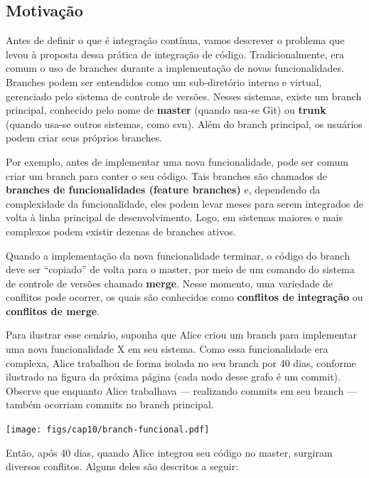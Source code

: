 \documentclass[
  11pt,
  twoside]{book}
\let\origfigure\figure
\let\endorigfigure\endfigure
\renewenvironment{figure}[1][2] {
    \expandafter\origfigure\expandafter[!h]
} {
    \endorigfigure
}
\begin{document}
\hypertarget{motivauxe7uxe3o}{%
\subsection{Motivação}\label{motivauxe7uxe3o}}

Antes de definir o que é integração contínua, vamos descrever o problema
que levou à proposta dessa prática de integração de código.
Tradicionalmente, era comum o uso de branches durante a implementação de
novas funcionalidades. Branches podem ser entendidos como um
sub-diretório interno e virtual, gerenciado pelo sistema de controle de
versões. Nesses sistemas, existe um branch principal, conhecido pelo
nome de \textbf{master} (quando usa-se Git) ou \textbf{trunk} (quando
usa-se outros sistemas, como svn). Além do branch principal, os usuários
podem criar seus próprios branches.

Por exemplo, antes de implementar uma nova funcionalidade, pode ser
comum criar um branch para conter o seu código. Tais branches são
chamados de \textbf{branches de funcionalidades (feature branches)} e,
dependendo da complexidade da funcionalidade, eles podem levar meses
para serem integrados de volta à linha principal de desenvolvimento.
Logo, em sistemas maiores e mais complexos podem existir dezenas de
branches ativos.

  Quando a
implementação da nova funcionalidade terminar, o código do branch deve
ser ``copiado'' de volta para o master, por meio de um comando do
sistema de controle de versões chamado \textbf{merge}. Nesse momento,
uma variedade de conflitos pode ocorrer, os quais são conhecidos como
\textbf{conflitos de integração} ou \textbf{conflitos de merge}.

Para ilustrar esse cenário, suponha que Alice criou um branch para
implementar uma nova funcionalidade X em seu sistema. Como essa
funcionalidade era complexa, Alice trabalhou de forma isolada no seu
branch por 40 dias, conforme ilustrado na figura da próxima página (cada
nodo desse grafo é um commit). Observe que enquanto Alice trabalhava ---
realizando commits em seu branch --- também ocorriam commits no branch
principal.

\begin{figure}
\centering
\texttt{[image: figs/cap10/branch-funcional.pdf]}
\caption{Desenvolvimento usando branches de funcionalidades.}
\end{figure}

Então, após 40 dias, quando Alice integrou seu código no master,
surgiram diversos conflitos. Alguns deles são descritos a seguir:
\end{document}
